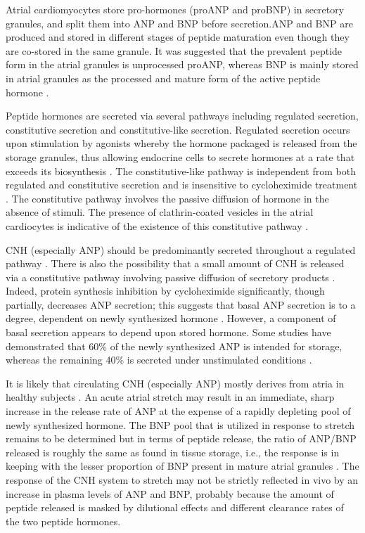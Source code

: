 \documentclass[14pt,a4paper,onecolumn]{extarticle}
\begin{document}
Atrial cardiomyocytes store pro-hormones (proANP and proBNP) in secretory granules, and split them into ANP and BNP before secretion.ANP and BNP are produced and stored in different stages of peptide maturation even though they are co-stored in the same granule. It was suggested that the prevalent peptide form in the atrial granules is unprocessed proANP, whereas BNP is mainly stored in atrial granules as the processed and mature form of the active peptide hormone \citep{12}\citep{13}\citep{18}.

Peptide hormones are secreted via several pathways including regulated secretion, constitutive secretion and constitutive-like secretion. Regulated secretion occurs upon stimulation by agonists whereby the hormone packaged is released from the storage granules, thus allowing endocrine cells to secrete hormones at a rate that exceeds its biosynthesis \citep{13}. The constitutive-like pathway is independent from both regulated and constitutive secretion and is insensitive to cycloheximide treatment \citep{13}. The constitutive pathway involves the passive diffusion of hormone in the absence of stimuli.  The presence of clathrin-coated vesicles in the atrial cardiocytes is indicative of the existence of this constitutive pathway \citep{13}.

CNH (especially ANP) should be predominantly secreted throughout a regulated pathway \citep{12}\citep{13}\citep{18}. There is also the possibility that a small amount of CNH is released via a constitutive pathway involving passive diffusion of secretory products \citep{12}\citep{13}\citep{18}.  Indeed, protein synthesis inhibition by cycloheximide significantly, though partially, decreases ANP secretion; this suggests that basal ANP secretion is to a degree, dependent on newly synthesized hormone \citep{13}. However, a component of basal secretion appears to depend upon stored hormone. Some studies have demonstrated that 60\% of the newly synthesized ANP is intended for storage, whereas the remaining 40\% is secreted under unstimulated conditions \citep{13}.

It is likely that circulating CNH (especially ANP) mostly derives from atria in healthy subjects \citep{12-14}\citep{18}. An acute atrial stretch may result in an immediate, sharp increase in the release rate of ANP at the expense of a rapidly depleting pool of newly synthesized hormone. The BNP pool that is utilized in response to stretch remains to be determined but in terms of peptide release, the ratio of ANP/BNP released is roughly the same as found in tissue storage, i.e., the response is in keeping with the lesser proportion of BNP present in mature atrial granules \citep{18}. The response of the CNH system to stretch may not be strictly reflected in vivo by an increase in plasma levels of ANP and BNP, probably because the amount of peptide released is masked by dilutional effects and different clearance rates of the two peptide hormones.
\end{document}
